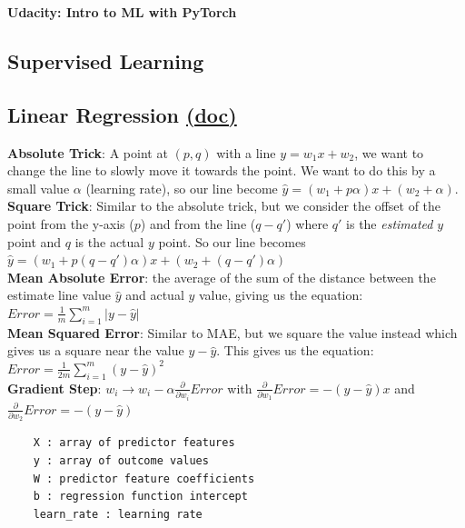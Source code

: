 \documentclass[11pt, a4paper]{article}
\begin{document}
	\begin{titlepage}
		\begin{center} \Huge \textbf{Udacity: Intro to ML with PyTorch} \end{center}
		\tableofcontents
		\newpage
	\end{titlepage}

	\begin{spacing}{1.1}
	\section{Supervised Learning}
	\subsection{Linear Regression \href{https://scikit-learn.org/stable/modules/linear_model.html}{(doc)}}
	\textbf{Absolute Trick}: A point at $(p,q)$ with a line $y = w_1x + w_2$, we want to change the line to slowly move it towards the point. We want to do this by a small value $\alpha$ (learning rate), so our line become $\hat{y} = (w_1 + p\alpha)x + (w_2 + \alpha)$. \vspace*{2mm}\\
	\textbf{Square Trick}: Similar to the absolute trick, but we consider the offset of the point from the y-axis ($p$) and from the line ($q-q'$) where $q'$ is the \textit{estimated} $y$ point and $q$ is the actual $y$ point. So our line becomes $\hat{y} = (w_1 + p(q-q')\alpha)x + (w_2 + (q-q')\alpha)$\vspace*{2mm}\\
	\textbf{Mean Absolute Error}: the average of the sum of the distance between the estimate line value $\hat{y}$ and actual $y$ value, giving us the equation: $Error = \frac{1}{m} \sum_{i=1}^{m}|y-\hat{y}|$ \vspace*{2mm}\\
	\textbf{Mean Squared Error}: Similar to MAE, but we square the value instead which gives us a square near the value $y-\hat{y}$. This gives us the equation: $Error = \frac{1}{2m} \sum_{i=1}^{m}(y-\hat{y})^2$ \vspace*{2mm}\\
	\textbf{Gradient Step}: $w_i \rightarrow w_i - \alpha\frac{\partial}{\partial w_i}Error$ with $\frac{\partial}{\partial w_1}Error = -(y-\hat{y})x$ and $\frac{\partial}{\partial w_2}Error = -(y-\hat{y})$
	\begin{lstlisting}
	X : array of predictor features
	y : array of outcome values
	W : predictor feature coefficients
	b : regression function intercept
	learn_rate : learning rate
	

\end{lstlisting}
\end{spacing}
\end{document}
